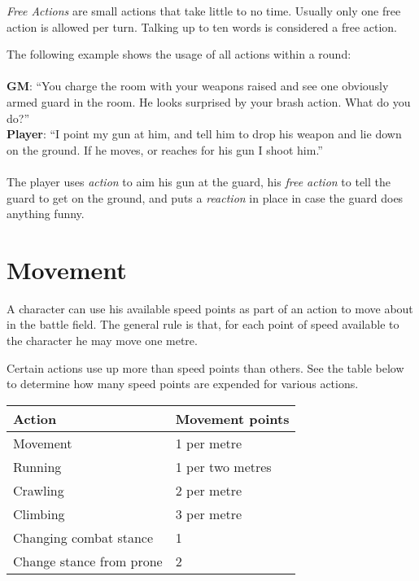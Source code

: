 \emph{Free Actions} are small actions that take little to no time. Usually only
one free action is allowed per turn. Talking up to ten words is considered a
free action.

The following example shows the usage of all actions within a round:
\\
\\
\textbf{GM}: ``You charge the room with your weapons raised and see one
obviously armed guard in the room. He looks surprised by your brash
action. What do you do?''
\\
\textbf{Player}: ``I point my gun at him, and tell him to drop his weapon and
lie down on the ground. If he moves, or reaches for his gun I shoot him.''
\\
\\
The player uses \emph{action} to aim his gun at the guard, his
\emph{free action} to tell the guard to get on the ground, and puts a
\emph{reaction} in place in case the guard does anything funny.

\section{Movement}
\label{sec:7-Movement}

A character can use his available speed points as part of an action to move
about in the battle field. The general rule is that, for each point of speed
available to the character he may move one metre.

Certain actions use up more than speed points than others. See the table below
to determine how many speed points are expended for various actions.

\begin{center}
  \begin{tabular}{| l | l |}
    \hline
    Action                   & Movement points   \\ \hline
    Movement                 & 1 per metre       \\ \hline
    Running                  & 1 per two metres  \\ \hline
    Crawling                 & 2 per metre       \\ \hline
    Climbing                 & 3 per metre       \\ \hline
    Changing combat stance   & 1                 \\ \hline
    Change stance from prone & 2                 \\ \hline
  \end{tabular}
\end{center}

